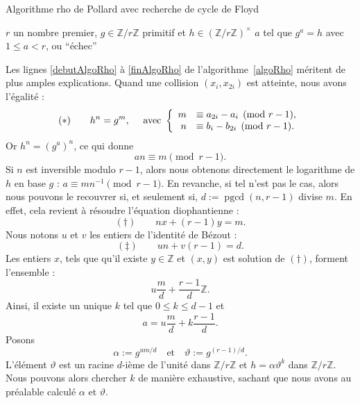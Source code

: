 \documentclass[a4paper, titlepage]{article}
\theoremstyle{definition}
\theoremstyle{remark}
\def\Z{\mathbb Z}
\def\pgcd{\operatorname{pgcd}}
\begin{document}
\begin{algorithm}[h]
\caption{Algorithme rho de Pollard avec recherche de cycle de Floyd}
\label{algoRho}
\begin{algorithmic}[1]
\REQUIRE $r$ un nombre premier, $g\in \Z/r\Z$ primitif et $h \in (\Z/r\Z)^\times$ 
\ENSURE $a$ tel que $g^a = h$ avec $1 \leqslant a < r$, ou ``échec''
\ENDWHILE
\STATE{$d \gets \pgcd(b_1- b_2, r - 1)$}\label{debutAlgoRho}
		\ENDIF
	\ENDFOR	
\ELSE\label{finAlgoRho}
\ENDIF
\end{algorithmic}
\end{algorithm}

Les lignes \ref{debutAlgoRho} à \ref{finAlgoRho} de l'algorithme~\ref{algoRho} méritent de plus amples explications. Quand une collision $(x_i, x_{2i})$ est atteinte, nous avons l'égalité : 
$$(\ast)\qquad h^n = g^m, \quad\text{ avec }\left\{\begin{array}{r l}
m &\equiv a_{2i} - a_i \pmod{r-1}, \\
n &\equiv b_i - b_{2i} \pmod{r-1}.
\end{array}\right.$$
Or $h^n = {(g^a)}^n$, ce qui donne
$$an \equiv m \pmod{r-1}.$$
Si $n$ est inversible modulo $r-1$, alors nous obtenons directement le logarithme de $h$ en base $g$ : $a \equiv mn^{-1} \pmod{r-1}$. En revanche, si tel n'est pas le cas, alors nous pouvons le recouvrer si, et seulement si, $d := \pgcd(n,r-1)$ divise $m$. En effet, cela revient à résoudre l'équation diophantienne :
$$(\dagger)\qquad nx + (r-1)y = m.$$
Nous notons $u$ et $v$ les entiers de l'identité de Bézout :
$$(\ddagger)\qquad un + v(r-1) = d.$$
Les entiers $x$, tels que qu'il existe $y\in\Z$ et $(x,y)$ est solution de $(\dagger)$, forment l'ensemble :
$$u\frac{m}{d} + \frac{r-1}{d}\Z.$$
Ainsi, il existe un unique $k$ tel que $0 \leqslant k \leqslant d -1$ et $$a = u\frac{m}{d} + k\frac{r-1}{d}.$$
Posons $$\alpha := g^{um/d} \quad\text{et}\quad\vartheta := g^{(r-1)/d}.$$
L'élément $\vartheta$ est un racine $d$-ième de l'unité dans $\Z/r\Z$ et $h = \alpha \vartheta^k$ dans $\Z/r\Z$. Nous pouvons alors chercher $k$ de manière exhaustive, sachant que nous avons au préalable calculé $\alpha$ et $\vartheta$.
\end{document}
